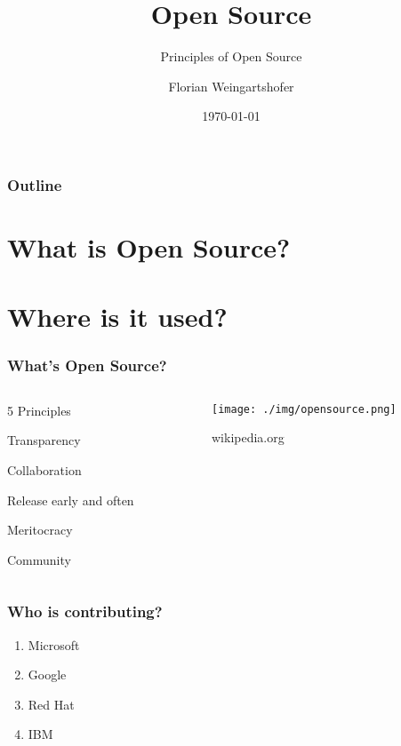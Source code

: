 \documentclass{beamer}
\title{Open Source}
\subtitle{Principles of Open Source}
\author{Florian Weingartshofer}
\institute{FH Hagenberg}
\date{\today}
\begin{document}
\titlepage

\begin{frame}
  \frametitle{Outline}
  \tableofcontents
\end{frame}

\section{What is Open Source?}
\section{Where is it used?}

\begin{frame}
  \frametitle{What's Open Source?}
  \begin{columns}
    \begin{column}{0.5\textwidth}

      \begin{block}{5 Principles}

      Transparency

      Collaboration

      Release early and often

      Meritocracy

      Community
      \end{block}
    \end{column}
    \begin{column}{0.5\textwidth}  %
      \begin{center}
        \begin{figure}
          \texttt{[image: ./img/opensource.png]}
          \caption{wikipedia.org}
        \end{figure}
      \end{center}
    \end{column}
  \end{columns}
\end{frame}

\begin{frame}
  \frametitle{Who is contributing?}
  \begin{enumerate}
  \item Microsoft
  \item Google
  \item Red Hat
  \item IBM
  \end{enumerate}
\end{frame}
\end{document}
